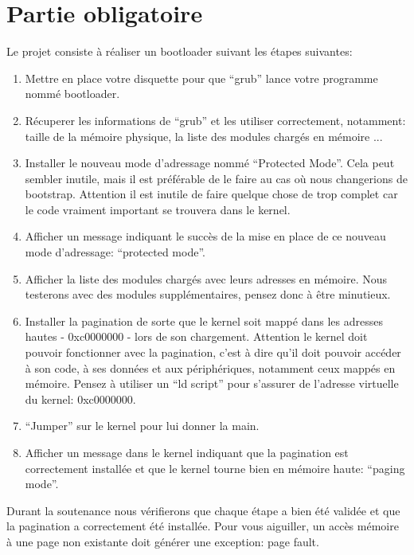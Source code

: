 \documentclass[10pt,a4wide]{article}
\begin{document}
\section{Partie obligatoire}

Le projet consiste \`a r\'ealiser un bootloader suivant les \'etapes suivantes:

\begin{enumerate}

\item Mettre en place votre disquette pour que ``grub'' lance votre programme
      nomm\'e bootloader.
\item R\'ecuperer les informations de ``grub'' et les utiliser correctement,
      notamment: taille de la m\'emoire physique, la liste des modules
      charg\'es en m\'emoire ...
\item Installer le nouveau mode d'adressage nomm\'e ``Protected Mode''.
      Cela peut sembler inutile, mais il est pr\'ef\'erable de le faire
      au cas o\`u nous changerions de bootstrap. Attention il est inutile
      de faire quelque chose de trop complet car le code vraiment
      important se trouvera dans le kernel.
\item Afficher un message indiquant le succ\`es de la mise en place de ce
      nouveau mode d'adressage: ``protected mode''.
\item Afficher la liste des modules charg\'es avec leurs adresses en m\'emoire.
      Nous testerons avec des modules suppl\'ementaires, pensez donc \`a \^etre
      minutieux.
\item Installer la pagination de sorte que le kernel soit mapp\'e dans les
      adresses hautes - 0xc0000000 - lors de son chargement.
      Attention le kernel doit pouvoir fonctionner avec la pagination,
      c'est \`a dire qu'il doit pouvoir acc\'eder \`a son code, \`a ses
      donn\'ees et aux p\'eriph\'eriques, notamment ceux mapp\'es en m\'emoire.
      Pensez \`a utiliser un ``ld script'' pour s'assurer de l'adresse
      virtuelle du kernel: 0xc0000000.
\item ``Jumper'' sur le kernel pour lui donner la main.
\item Afficher un message dans le kernel indiquant que la pagination est
      correctement install\'ee et que le kernel tourne bien en m\'emoire haute:
      ``paging mode''.

\end{enumerate}

Durant la soutenance nous v\'erifierons que chaque \'etape a bien \'et\'e
valid\'ee et que la pagination a correctement \'et\'e install\'ee. Pour vous
aiguiller, un acc\`es m\'emoire \`a une page non existante doit g\'en\'erer
une exception: page fault.
\end{document}
